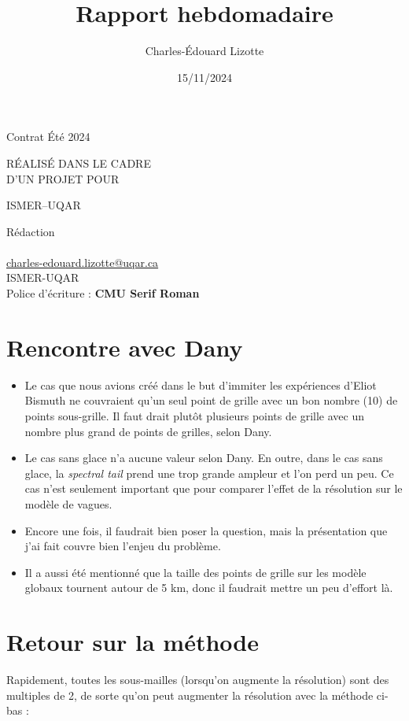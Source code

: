\documentclass[10pt]{article}
\author{Charles-Édouard Lizotte}
\date{15/11/2024}
\title{Rapport hebdomadaire}
\makeatletter
\numberwithin{equation}{section}
\newcommand{\mytitlepage}{
\begin{titlepage}
\begin{center}
{\Huge \thesubtitle \par}
\vspace{2cm}
{\Huge \MakeUppercase{\thetitle} \par}
\vspace{2cm}
RÉALISÉ DANS LE CADRE\\ D'UN PROJET POUR \par
\vspace{2cm}
{\Huge ISMER--UQAR \par}
\vspace{2cm}
{\thedate}
\end{center}
\vfill
Rédaction \\
{\theauthor}\\
\url{charles-edouard.lizotte@uqar.ca}\\
ISMER-UQAR\\
Police d'écriture : \textbf{CMU Serif Roman}
\end{titlepage}
}
\newcommand{\thesubtitle}{Contrat Été 2024}
\makeatother
\begin{document}
\mytitlepage
\tableofcontents\newpage
\section{Rencontre avec Dany}
\label{sec:org542a210}

\begin{itemize}
\item Le cas que nous avions créé dans le but d'immiter les expériences d'Eliot Bismuth ne couvraient qu'un seul point de grille avec un bon nombre (10) de points sous-grille. Il faut drait plutôt plusieurs points de grille avec un nombre plus grand de points de grilles, selon Dany.

\item Le cas sans glace n'a aucune valeur selon Dany. En outre, dans le cas sans glace, la \emph{spectral tail} prend une trop grande ampleur et l'on perd un peu. Ce cas n'est seulement important que pour comparer l'effet de la résolution sur le modèle de vagues.

\item Encore une fois, il faudrait bien poser la question, mais la présentation que j'ai fait couvre bien l'enjeu du problème.

\item Il a aussi été mentionné que la taille des points de grille sur les modèle globaux tournent autour de 5 km, donc il faudrait mettre un peu d'effort là. \newpage
\end{itemize}
\section{Retour sur la méthode}
\label{sec:orgf3f2c9a}

Rapidement, toutes les sous-mailles (lorsqu'on augmente la résolution) sont des multiples de 2, de sorte qu'on peut augmenter la résolution avec la méthode ci-bas : 

\end{document}
